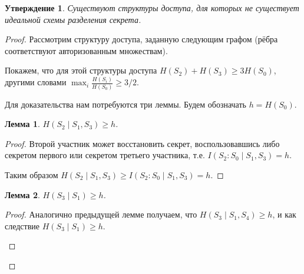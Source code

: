 \documentclass[12pt]{article}
\theoremstyle{definition}
\theoremstyle{plain}
\newtheorem{lemma}{Лемма}[section]
\newtheorem{statement}{Утверждение}[section]
\theoremstyle{remark}
\begin{document}
\begin{statement}
    Существуют структуры доступа, для которых не существует идеальной схемы разделения секрета.
\end{statement}
\begin{proof}
    Рассмотрим структуру доступа, заданную следующим графом (рёбра соответствуют авторизованным
    множествам).
    \begin{center}
    \end{center}
    Покажем, что для этой структуры доступа $H(S_2) + H(S_3) \ge 3H(S_0)$, другими словами
    $\max_i\frac{H(S_i)}{H(S_0)} \ge 3/2$.

    Для доказательства нам потребуются три леммы. Будем обозначать $h = H(S_0)$.
    \begin{lemma}
        $H(S_2\mid S_1, S_3) \ge h$.
    \end{lemma}
    \begin{proof} Второй участник может восстановить секрет, воспользовавшись либо секретом первого
        или секретом третьего участника, т.е. $I(S_2 : S_0 \mid S_1, S_3) = h$.
    \begin{center}
    \end{center}
    Таким образом $H(S_2 \mid S_1, S_3) \ge  I(S_2:S_0\mid S_1,S_3) = h$.
    \end{proof}

    \begin{lemma}
        $H(S_3\mid S_1) \ge h$.
    \end{lemma}
    \begin{proof} Аналогично предыдущей лемме получаем, что $H(S_3\mid S_1, S_4)\ge h$, и как
        следствие $H(S_3\mid S_1)\ge h$.
    \begin{center}
\end{center}
\end{proof}
\end{proof}
\end{document}
